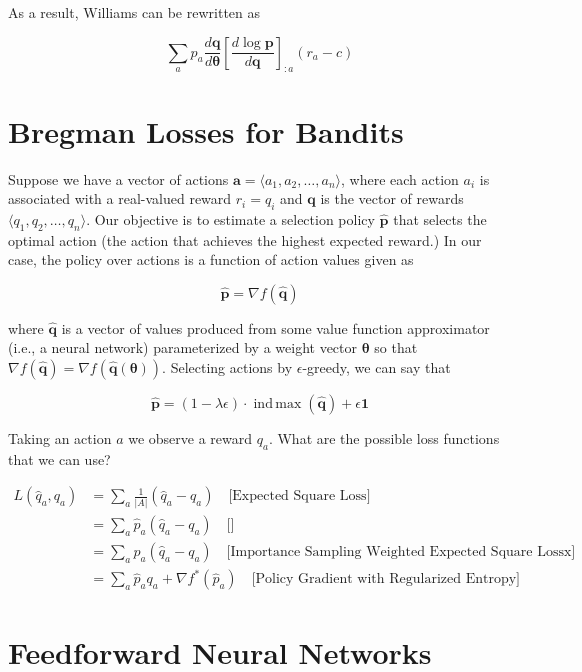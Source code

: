 \documentclass[10pt]{article}
\newcommand{\indmax}{\operatorname{ind\,max}}
\theoremstyle{definition}
\begin{document}
\noindent
As a result, Williams can be rewritten as

$$
\sum_a p_a \frac{d\mathbf{q}}{d\pmb{\theta}}\left[\frac{d\log\mathbf{p}}{d\mathbf{q}}\right]_{:a}(r_a - c)
$$

\section*{Bregman Losses for Bandits}

Suppose we have a vector of actions $\mathbf{a} = \langle a_1, a_2, \hdots, a_n\rangle$, where each action $a_i$ is associated with a real-valued reward $r_i = q_i$ and $\mathbf{q}$ is the vector of rewards $\langle q_1, q_2, \hdots, q_n\rangle$. Our objective is to estimate a selection policy $\mathbf{\hat{p}}$ that selects the optimal action (the action that achieves the highest expected reward.) In our case, the policy over actions is a function of action values given as

$$
\mathbf{\hat{p}} = \nabla f(\mathbf{\hat{q}})
$$

\noindent
where $\mathbf{\hat{q}}$ is a vector of values produced from some value function approximator (i.e., a neural network) parameterized by a weight vector $\pmb{\theta}$ so that $\nabla f(\mathbf{\hat{q}}) = \nabla f(\mathbf{\hat{q}(\pmb{\theta})})$. Selecting actions by $\epsilon$-greedy, we can say that

$$
\mathbf{\hat{p}} = (1 - \lambda\epsilon)\cdot\indmax (\mathbf{\hat{q}}) + \epsilon\mathbf{1}
$$

\noindent
Taking an action $a$ we observe a reward $q_a$. What are the possible loss functions that we can use?

\begin{equation*}
\begin{aligned}
L(\hat{q}_a,q_a) & = \sum_a\frac{1}{\lvert A \rvert}(\hat{q}_a - q_a) \quad \text{[Expected Square Loss]} \\
& = \sum_a\hat{p}_a(\hat{q}_a - q_a) \quad \text{[]} \\
& = \sum_a p_a(\hat{q}_a - q_a) \quad \text{[Importance Sampling Weighted Expected Square Lossx]} \\
& = \sum_a \hat{p}_a q_a + \nabla f^*(\hat{p}_a) \quad \text{[Policy Gradient with Regularized Entropy]}
\end{aligned}
\end{equation*}

\section*{Feedforward Neural Networks}
\end{document}
